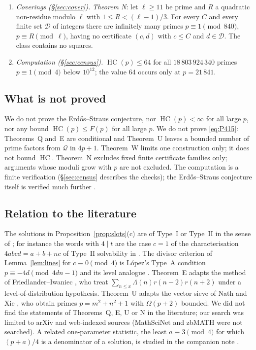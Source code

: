 \documentclass[11pt,reqno]{amsart}
\theoremstyle{definition}
\newcommand{\cQ}{\mathcal Q}
\newcommand{\HC}{\operatorname{HC}}
\begin{document}
\begin{enumerate}
$\HC(p)>X$ only for $X<(4+o(1))\log p$, except possibly at its least
member.
\item\emph{Coverings (\S\ref{sec:cover}).}  \emph{Theorem N}: let
$\ell\ge11$ be prime and $R$ a quadratic non-residue modulo $\ell$ with
$1\le R<(\ell-1)/3$.  For every $C$ and every finite set $\mathcal D$ of
integers there are infinitely many primes $p\equiv1\pmod{840}$,
$p\equiv R\pmod\ell$, having no certificate $(c,d)$ with $c\le C$ and
$d\in\mathcal D$.  The class contains no squares.
\item\emph{Computation (\S\ref{sec:census}).}  $\HC(p)\le64$ for all
$18\,803\,924\,340$ primes $p\equiv1\pmod4$ below $10^{12}$; the value
$64$ occurs only at $p=21\,841$.
\end{enumerate}

\subsection*{What is not proved}
We do not prove the Erd\H{o}s--Straus conjecture, nor $\HC(p)<\infty$ for
all large $p$, nor any bound $\HC(p)\le F(p)$ for all large $p$.  We do not
prove \eqref{eq:P415}: Theorems~Q and~E are conditional and Theorem~U
leaves a bounded number of prime factors from $\cQ$ in $4p+1$.  Theorem~W
limits one construction only; it does not bound $\HC$.  Theorem~N excludes
fixed finite certificate families only; arguments whose moduli grow with
$p$ are not excluded.  The computation is a finite verification
(\S\ref{sec:census} describes the checks); the Erd\H{o}s--Straus
conjecture itself is verified much further \cite{Salez,MD}.

\subsection*{Relation to the literature}
The solutions in Proposition~\ref{prop:slots}(c) are of Type~I or Type~II
in the sense of \cite{ET}; for instance the words with $4\mid t$ are the
case $c=1$ of the characterisation $4abcd=a+b+nc$ of Type~II solvability
in \cite[Prop.~2.7]{ET}.  The divisor criterion of Lemma~\ref{lem:lines}
for $c\equiv0\pmod 4$ is L\'opez's Type~A condition
$p\equiv-4d\pmod{4dn-1}$ and its level analogue \cite{Lopez}.  Theorem~E
adapts the method of Friedlander--Iwaniec \cite[Thm.~4, \S6]{FI09}, who
treat $\sum_{n\le x}\Lambda(n)r(n-2)r(n+2)$ under a level-of-distribution
hypothesis.  Theorem~U adapts the vector sieve of Nath and Xie
\cite{NX}, who obtain primes $p=m^2+n^2+1$ with $\Omega(p+2)$ bounded.  We
did not find the statements of Theorems~Q, E, U or N in the literature; our
search was limited to arXiv and web-indexed sources (MathSciNet and
zbMATH were not searched).  A related one-parameter statistic,
the least $a\equiv3\pmod4$ for which $(p+a)/4$ is a denominator of a
solution, is studied in the companion note \cite{Win}.
\end{document}
